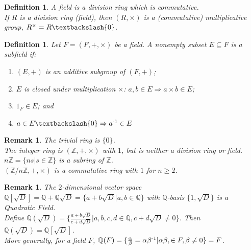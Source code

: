 \documentclass[a4paper,sfsidenotes,openany]{tufte-book}
\theoremstyle{theorem}
\newtheorem{definition}[theorem]{Definition}
\newtheorem{remark}[theorem]{Remark}
\begin{document}
\begin{fullwidth}
\begin{definition}
A \textit{{\color{blue} field}} is a division ring which is commutative.\\
If $R$ is a division ring (field), then $(R, \times)$ is a (commutative) \textit{{\color{blue} multiplicative group}}, $R^\times = R \textbackslash \{0\}$.\\
\end{definition}
\>

\begin{definition}
Let $F = (F, +, \times) $ be a field. A nonempty subset $E \subseteq F$ is a \textit{{\color{blue} subfield}} if:
\begin{enumerate}[label=(\roman*),leftmargin=0pt, itemindent=4em, align=left]
\item $(E, +)$ is an additive subgroup of $(F, +)$;
\item $E$ is closed under multiplication $\times$: $a, b \in E \Rightarrow a \times b \in E$;
\item $1_F \in E$; and
\item $a \in E \textbackslash \{0\} \Rightarrow a \textsuperscript{-1} \in E$
\end{enumerate}
\end{definition}
\>

\begin{remark}
The \textit{{\color{blue} trivial ring}} is $\{0\}$.\\
The \textit{{\color{blue} integer ring}} is $(\mathbb{Z}, +, \times )$ with $ 1 $, but is neither a division ring or field.\\
$n \mathbb{Z} = \{ns | s \in \mathbb{Z}\} $ is a subring of $\mathbb{Z}$.\\
$(\mathbb{Z} / n \mathbb{Z}, +, \times) $ is a commutative ring with $ 1 $ for $ n \geq 2 $.\\
\end{remark}
\>

\begin{remark}
The $2$-dimensional vector space $\mathbb{Q}[\sqrt{D}] = \mathbb{Q} + \mathbb{Q}\sqrt{D} = \{a+b\sqrt{D}|a, b \in \mathbb{Q} \}$ with $\mathbb{Q}$-basis $\{1, \sqrt{D} \}$ is a \textit{{\color{blue} Quadratic Field}}.\\
Define $\mathbb{Q}(\sqrt{D}) = \{ \frac{ a+b\sqrt{D} }{ c+d\sqrt{D} } | a, b, c, d \in \mathbb{Q}, c + d\sqrt{D} \neq 0 \} $. Then $\mathbb{Q}(\sqrt{D}) = \mathbb{Q}[\sqrt{D}]$.\\
More generally, for a field $F$, $\mathbb{Q}(F) = \{\frac{\alpha}{\beta} = \alpha \beta \textsuperscript{-1} | \alpha \beta , \in F, \beta \neq 0\} = F$.\\
\end{remark}
\>


\end{fullwidth}
\end{document}
